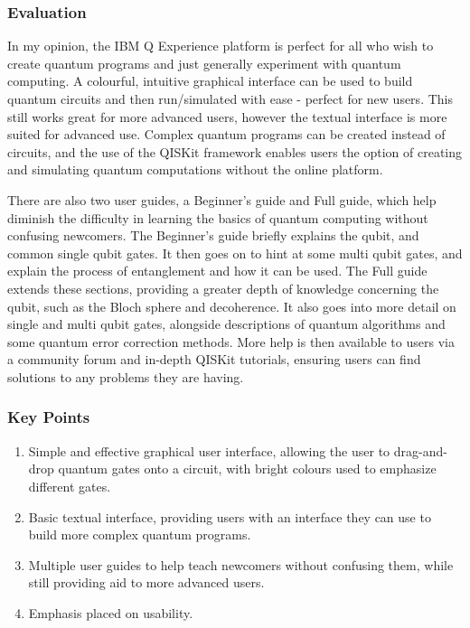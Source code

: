 \documentclass[a4paper,11pt, titlepage, twoside]{article}
\begin{document}
\subsubsection{Evaluation}
In my opinion, the IBM Q Experience platform is perfect for all who wish to create quantum programs and just generally experiment with quantum computing. A colourful, intuitive graphical interface can be used to build quantum circuits and then run/simulated with ease - perfect for new users. This still works great for more advanced users, however the textual interface is more suited for advanced use. Complex quantum programs can be created instead of circuits, and the use of the QISKit framework enables users the option of creating and simulating quantum computations without the online platform. \par
There are also two user guides, a Beginner's guide and Full guide, which help diminish the difficulty in learning the basics of quantum computing without confusing newcomers. The Beginner's guide briefly explains the qubit, and common single qubit gates. It then goes on to hint at some multi qubit gates, and explain the process of entanglement and how it can be used. The Full guide extends these sections, providing a greater depth of knowledge concerning the qubit, such as the Bloch sphere and decoherence. It also goes into more detail on single and multi qubit gates, alongside descriptions of quantum algorithms and some quantum error correction methods. More help is then available to users via a community forum and in-depth QISKit tutorials, ensuring users can find solutions to any problems they are having.

\subsubsection{Key Points}
\begin{enumerate}
	\item Simple and effective graphical user interface, allowing the user to drag-and-drop quantum gates onto a circuit, with bright colours used to emphasize different gates.
	\item Basic textual interface, providing users with an interface they can use to build more complex quantum programs.
	\item Multiple user guides to help teach newcomers without confusing them, while still providing aid to more advanced users. 
	\item Emphasis placed on usability.
\end{enumerate}
\end{document}
